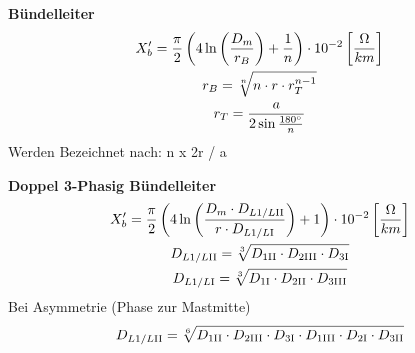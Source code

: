 \begin{itemize}
\textbf{Bündelleiter}
\begin{gather*}
    X_{b}' = \frac{\pi}{2} \left( 4 \ln \left( \frac{D_{m}}{r_{B}}\right) + \frac{1}{n} \right) \cdot 10 ^{-2}   \left[\frac{\Omega}{km}\right]\\
    r_{B} = \sqrt[n]{n \cdot r \cdot r_{T}^{n-1}}\\
    r_{T} = \frac{a}{2 \sin \frac{180 \degree}{n}}
\end{gather*}
Werden Bezeichnet nach: n x 2r / a

\textbf{Doppel 3-Phasig Bündelleiter}
\begin{gather*}
    X_{b}' = \frac{\pi}{2} \left( 4 \ln \left( \frac{D_{m} \cdot D_{L1/L\RN{2}}}{r \cdot D_{L1/L\RN{1}}}\right) + 1 \right) \cdot 10 ^{-2}   \left[\frac{\Omega}{km}\right]\\
    D_{L1/L\RN{2}} = \sqrt[3]{D_{1\RN{2}} \cdot D_{2\RN{3}} \cdot D_{3\RN{1}}}\\
    D_{L1/L\RN{1}} = \sqrt[3]{D_{1\RN{1}} \cdot D_{2\RN{2}} \cdot D_{3\RN{3}}}
\end{gather*}
Bei Asymmetrie (Phase zur Mastmitte)
\begin{equation*}
    D_{L1/L\RN{2}} = \sqrt[6]{D_{1\RN{2}} \cdot D_{2\RN{3}} \cdot D_{3\RN{1}} \cdot D_{1\RN{3}} \cdot D_{2\RN{1}} \cdot D_{3\RN{2}}}
\end{equation*}
\end{itemize}
